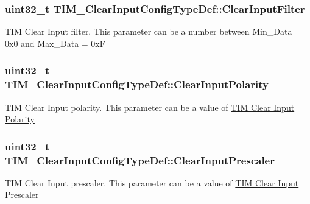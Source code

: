 \subsubsection[{\texorpdfstring{Clear\+Input\+Filter}{ClearInputFilter}}]{\setlength{\rightskip}{0pt plus 5cm}uint32\+\_\+t T\+I\+M\+\_\+\+Clear\+Input\+Config\+Type\+Def\+::\+Clear\+Input\+Filter}\hypertarget{struct_t_i_m___clear_input_config_type_def_a6d2e06a970e30aaf4f8a6091e443eecf}{}\label{struct_t_i_m___clear_input_config_type_def_a6d2e06a970e30aaf4f8a6091e443eecf}
T\+IM Clear Input filter. This parameter can be a number between Min\+\_\+\+Data = 0x0 and Max\+\_\+\+Data = 0xF 
\subsubsection[{\texorpdfstring{Clear\+Input\+Polarity}{ClearInputPolarity}}]{\setlength{\rightskip}{0pt plus 5cm}uint32\+\_\+t T\+I\+M\+\_\+\+Clear\+Input\+Config\+Type\+Def\+::\+Clear\+Input\+Polarity}\hypertarget{struct_t_i_m___clear_input_config_type_def_a49dbc65edc5316822fcabd61cc8409de}{}\label{struct_t_i_m___clear_input_config_type_def_a49dbc65edc5316822fcabd61cc8409de}
T\+IM Clear Input polarity. This parameter can be a value of \hyperlink{group___t_i_m___clear_input___polarity}{T\+IM Clear Input Polarity} 
\subsubsection[{\texorpdfstring{Clear\+Input\+Prescaler}{ClearInputPrescaler}}]{\setlength{\rightskip}{0pt plus 5cm}uint32\+\_\+t T\+I\+M\+\_\+\+Clear\+Input\+Config\+Type\+Def\+::\+Clear\+Input\+Prescaler}\hypertarget{struct_t_i_m___clear_input_config_type_def_a509cecb64fec71391ddc8b4703e09cfe}{}\label{struct_t_i_m___clear_input_config_type_def_a509cecb64fec71391ddc8b4703e09cfe}
T\+IM Clear Input prescaler. This parameter can be a value of \hyperlink{group___t_i_m___clear_input___prescaler}{T\+IM Clear Input Prescaler} 
